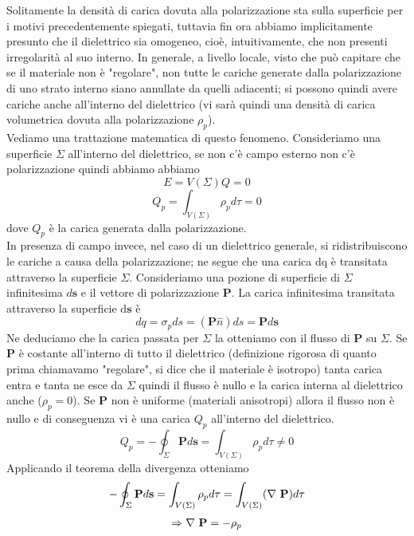 \documentclass[
10pt, %
a4paper, %
oneside, %
headinclude,footinclude, %
BCOR5mm, %
]{scrartcl}
\begin{document}
Solitamente la densità di carica dovuta alla polarizzazione sta sulla superficie per i motivi precedentemente spiegati, tuttavia fin ora abbiamo implicitamente presunto che il dielettrico sia omogeneo, cioè, intuitivamente, che non presenti irregolarità al suo interno.
In generale, a livello locale, visto che può capitare che se il materiale non è "regolare", non tutte le cariche generate dalla polarizzazione di uno strato interno siano annullate da quelli adiacenti; si possono quindi avere cariche anche all'interno del dielettrico (vi sarà quindi una densità di carica volumetrica dovuta alla polarizzazione \(\rho_p\)).\\
Vediamo una trattazione matematica di questo fenomeno. Consideriamo una superficie $\Sigma$ all'interno del dielettrico, se non c'è campo esterno non c'è polarizzazione quindi abbiamo abbiamo
\[E = V(\Sigma) Q = 0\]
\[Q_p = \int_{V(\Sigma)}\rho_p d\tau = 0\]
dove \(Q_p\) è la carica generata dalla polarizzazione.\\
In presenza di campo invece, nel caso di un dielettrico generale, si ridistribuiscono le cariche a causa della polarizzazione; ne segue che una carica dq è transitata attraverso la superficie $\Sigma$. Consideriamo una pozione di superficie di \(\Sigma\) infinitesima $d\mathbf{s}$ e il vettore di polarizzazione $\mathbf{P}$. La carica infinitesima transitata attraverso la superficie d$\mathbf{s}$ è
\[dq = \sigma_pds=(\mathbf{P}\hat{n})ds = \mathbf{P}d\mathbf{s}\]
Ne deduciamo che la carica passata per \(\Sigma\) la otteniamo con il flusso di $\mathbf{P}$ su $\Sigma$. Se $\mathbf{P}$ è costante all'interno di tutto il dielettrico (definizione rigorosa di quanto prima chiamavamo "regolare", si dice che il materiale è isotropo) tanta carica entra e tanta ne esce da $\Sigma$ quindi il flusso è nullo e la carica interna al dielettrico anche (\(\rho_p = 0\)). Se $\mathbf{P}$ non è uniforme (materiali anisotropi) allora il flusso non è nullo e di conseguenza vi è una carica $Q_p$ all'interno del dielettrico. 
\[ Q_p = -\oint_{\Sigma} \mathbf{P}d\mathbf{s} = \int_{V(\Sigma)}\rho_p d\tau \neq 0 \]
Applicando il teorema della divergenza otteniamo
\[-\oint_{\Sigma} \mathbf{P}d\mathbf{s} = \int_{V(\Sigma)}\rho_p d\tau = \int_{V(\Sigma)}(\mathbf{\nabla\ }\mathbf{P})d\tau \]
\begin{align}\label{eq:gradiente_vettore_polarizzazione}
\Rightarrow \mathbf{\nabla\ }\mathbf{P} = -\rho_p
\end{align}
\end{document}
